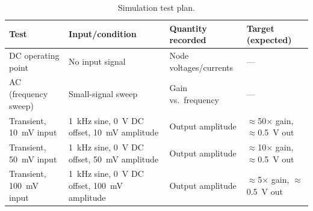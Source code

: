 \begin{table}[!htbp]
\centering
\caption{Simulation test plan.}
\label{tab:sim-setup}
\begin{tabularx}{\textwidth}{@{}p{3.4cm}Xp{3.2cm}X@{}}
\toprule
\textbf{Test} & \textbf{Input/condition} & \textbf{Quantity recorded} & \textbf{Target (expected)} \\
\midrule
DC operating point & No input signal & Node voltages/currents & --- \\
AC (frequency sweep) & Small-signal sweep & Gain vs.\ frequency & --- \\
Transient, 10~mV input & 1~kHz sine, 0~V DC offset, 10~mV amplitude & Output amplitude & $\approx$50$\times$ gain, $\approx$0.5~V out \\
Transient, 50~mV input & 1~kHz sine, 0~V DC offset, 50~mV amplitude & Output amplitude & $\approx$10$\times$ gain, $\approx$0.5~V out \\
Transient, 100~mV input & 1~kHz sine, 0~V DC offset, 100~mV amplitude & Output amplitude & $\approx$5$\times$ gain, $\approx$0.5~V out \\
\bottomrule
\end{tabularx}
\end{table}

\noindent{}
